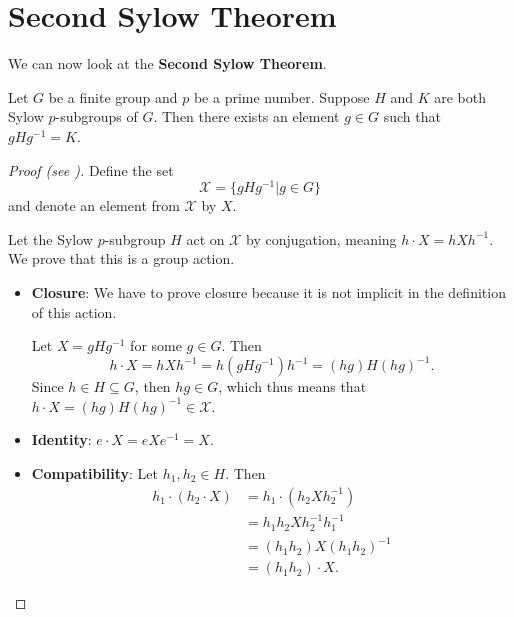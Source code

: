 \section{Second Sylow Theorem}
We can now look at the \textbf{Second Sylow Theorem}.
\begin{theorem}[Sylow II]\label{thrm-sylow-2}
    Let $G$ be a finite group and $p$ be a prime number. Suppose $H$ and $K$ are both Sylow $p$-subgroups of $G$. Then there exists an element $g \in G$ such that $gHg^{-1} = K$.
\end{theorem}
\begin{proof}[Proof (see {\cite[Theorem 11.10]{humphreys_1996}})]
    Define the set
    \[
        \mathcal{X} = \{gHg^{-1} \vert g \in G\}
    \]
    and denote an element from $\mathcal{X}$ by $X$.

    Let the Sylow $p$-subgroup $H$ act on $\mathcal{X}$ by conjugation, meaning $h \cdot X = hXh^{-1}$. We prove that this is a group action.
    
    \begin{itemize}
        \item \textbf{Closure}: We have to prove closure because it is not implicit in the definition of this action.

        Let $X = gHg^{-1}$ for some $g \in G$. Then
        \[
            h\cdot X = hXh^{-1} = h(gHg^{-1})h^{-1} = (hg)H(hg)^{-1}.
        \]
        Since $h \in H \subseteq G$, then $hg \in G$, which thus means that $h \cdot X = (hg)H(hg)^{-1} \in \mathcal{X}$.
        \item \textbf{Identity}: $e \cdot X = eXe^{-1} = X$.
        \item \textbf{Compatibility}: Let $h_1, h_2 \in H$. Then
        \begin{align*}
            h_1 \cdot (h_2 \cdot X) &= h_1 \cdot (h_2Xh_2^{-1})\\
            &= h_1h_2Xh_2^{-1}h_1^{-1}\\
            &= (h_1h_2)X(h_1h_2)^{-1}\\
            &= (h_1h_2) \cdot X.
        \end{align*}
    \end{itemize}


\end{proof}
